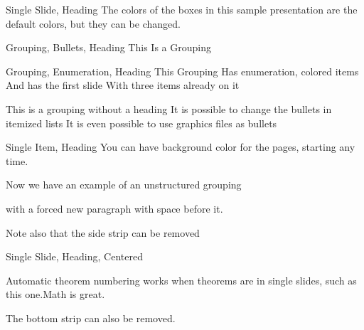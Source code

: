 \documentclass{seminar}
\begin{document}
\titleslide

\singlehead
{Single Slide, Heading}
{The colors of the boxes in this sample presentation are the default colors, but they can be changed.}

{
{Grouping, Bullets, Heading}
{This}
{Is a}
{Grouping}
}

{
{Grouping, Enumeration, Heading}
{This}
{Grouping}
{Has enumeration, colored items}
{And has the first slide}
{With three items already on it}
}

\bulletchoice{\textcolor{Purple}{\Large $\ast$}}

{
{This is a grouping without a heading}
{It is possible to change the bullets in itemized lists}
{It is even possible to use graphics files as bullets}
}

\pagecolor{Yellow}

\singlehead
{Single Item, Heading}
{You can have background color for the pages, starting any time.}

\sidestripempty

{
{Now}
{we have}
{an example}
{of an unstructured grouping}
{\par \bigskip with a forced new paragraph with space before it.}
{\par \bigskip \bigskip Note also that the side strip can be removed}
}

\sidestripfull
\bottomstripempty

\singleheadcenter
{Single Slide, Heading, Centered}
{Automatic theorem numbering works when theorems are in single slides, such as this one.\thm Math is great.\ethm \par \bigskip The bottom strip can also be removed.}
\end{document}
